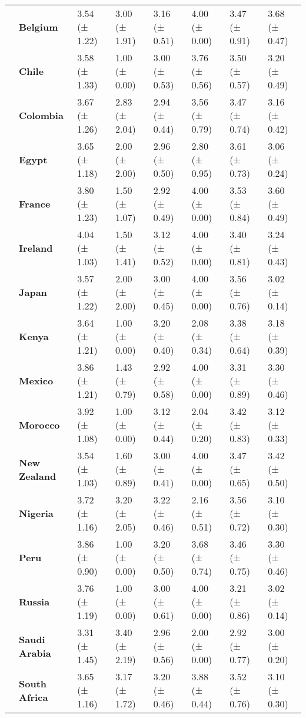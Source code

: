 \begin{longtable}{llllllll}
\textbf{} & \textbf{Belgium} & 3.54 (± 1.22) & 3.00 (± 1.91) & 3.16 (± 0.51) & 4.00 (± 0.00) & 3.47 (± 0.91) & 3.68 (± 0.47) \\
\textbf{} & \textbf{Chile} & 3.58 (± 1.33) & 1.00 (± 0.00) & 3.00 (± 0.53) & 3.76 (± 0.56) & 3.50 (± 0.57) & 3.20 (± 0.49) \\
\textbf{} & \textbf{Colombia} & 3.67 (± 1.26) & 2.83 (± 2.04) & 2.94 (± 0.44) & 3.56 (± 0.79) & 3.47 (± 0.74) & 3.16 (± 0.42) \\
\textbf{} & \textbf{Egypt} & 3.65 (± 1.18) & 2.00 (± 2.00) & 2.96 (± 0.50) & 2.80 (± 0.95) & 3.61 (± 0.73) & 3.06 (± 0.24) \\
\textbf{} & \textbf{France} & 3.80 (± 1.23) & 1.50 (± 1.07) & 2.92 (± 0.49) & 4.00 (± 0.00) & 3.53 (± 0.84) & 3.60 (± 0.49) \\
\textbf{} & \textbf{Ireland} & 4.04 (± 1.03) & 1.50 (± 1.41) & 3.12 (± 0.52) & 4.00 (± 0.00) & 3.40 (± 0.81) & 3.24 (± 0.43) \\
\textbf{} & \textbf{Japan} & 3.57 (± 1.22) & 2.00 (± 2.00) & 3.00 (± 0.45) & 4.00 (± 0.00) & 3.56 (± 0.76) & 3.02 (± 0.14) \\
\textbf{} & \textbf{Kenya} & 3.64 (± 1.21) & 1.00 (± 0.00) & 3.20 (± 0.40) & 2.08 (± 0.34) & 3.38 (± 0.64) & 3.18 (± 0.39) \\
\textbf{} & \textbf{Mexico} & 3.86 (± 1.21) & 1.43 (± 0.79) & 2.92 (± 0.58) & 4.00 (± 0.00) & 3.31 (± 0.89) & 3.30 (± 0.46) \\
\textbf{} & \textbf{Morocco} & 3.92 (± 1.08) & 1.00 (± 0.00) & 3.12 (± 0.44) & 2.04 (± 0.20) & 3.42 (± 0.83) & 3.12 (± 0.33) \\
\textbf{} & \textbf{New Zealand} & 3.54 (± 1.03) & 1.60 (± 0.89) & 3.00 (± 0.41) & 4.00 (± 0.00) & 3.47 (± 0.65) & 3.42 (± 0.50) \\
\textbf{} & \textbf{Nigeria} & 3.72 (± 1.16) & 3.20 (± 2.05) & 3.22 (± 0.46) & 2.16 (± 0.51) & 3.56 (± 0.72) & 3.10 (± 0.30) \\
\textbf{} & \textbf{Peru} & 3.86 (± 0.90) & 1.00 (± 0.00) & 3.20 (± 0.50) & 3.68 (± 0.74) & 3.46 (± 0.75) & 3.30 (± 0.46) \\
\textbf{} & \textbf{Russia} & 3.76 (± 1.19) & 1.00 (± 0.00) & 3.00 (± 0.61) & 4.00 (± 0.00) & 3.21 (± 0.86) & 3.02 (± 0.14) \\
\textbf{} & \textbf{Saudi Arabia} & 3.31 (± 1.45) & 3.40 (± 2.19) & 2.96 (± 0.56) & 2.00 (± 0.00) & 2.92 (± 0.77) & 3.00 (± 0.20) \\
\textbf{} & \textbf{South Africa} & 3.65 (± 1.16) & 3.17 (± 1.72) & 3.20 (± 0.46) & 3.88 (± 0.44) & 3.52 (± 0.76) & 3.10 (± 0.30) \\

\end{longtable}
